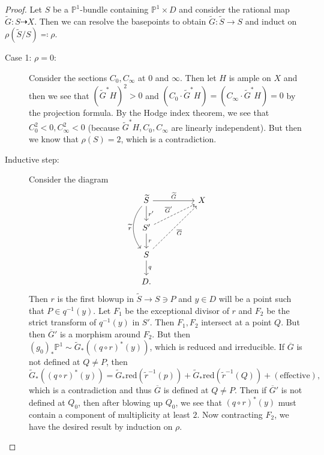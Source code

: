 \documentclass[leqno, openany]{memoir}
\theoremstyle{definition}
\theoremstyle{remark}
\theoremstyle{plain}
\theoremstyle{definition}
\theoremstyle{remark}
\renewcommand{\P}{\mathbb{P}}
\newcommand{\mr}[1]{\mathrm{#1}}
\newcommand{\ol}[1]{\overline{#1}}
\newcommand{\wt}[1]{\widetilde{#1}}
\begin{document}
\begin{proof}
    Let $S$ be a $\P^1$-bundle containing $\P^1 \times D$ and consider the rational map $\wt{G} \colon S \dashrightarrow X$. Then we can resolve the basepoints to obtain $\wt{G} \colon \wt{S} \to S$ and induct on $\rho(\wt{S} / S) \eqqcolon \rho$.
    \begin{description}
        \item[Case 1: $\rho = 0$:] Consider the sections $C_0, C_{\infty}$ at $0$ and $\infty$. Then let $H$ is ample on $X$ and then we see that ${(\wt{G}^* H)}^2 > 0$ and ${(C_0 \cdot \wt{G}^* H)} = {(C_{\infty} \cdot \wt{G}^* H)} = 0$ by the projection formula. By the Hodge index theorem, we see that $C_0^2 < 0, C_{\infty}^2 < 0$ (because $\wt{G}^* H, C_0, C_{\infty}$ are linearly independent). But then we know that $\rho(S) = 2$, which is a contradiction.
        \item[Inductive step:] Consider the diagram
            \begin{equation*}
            \begin{tikzcd}
                \wt{S} \ar{rr}{\wt{G}} \ar{d}{r'} \ar[swap,bend right=40]{dd}{\wt{r}} & & X \\
                S' \ar{d}{r} \ar[dashrightarrow]{urr}{\ol{G}'} \\
                S \ar{d}{q} \ar[swap,dashrightarrow]{uurr}{\ol{G}} \\
                D.
            \end{tikzcd}
            \end{equation*}
            Then $r$ is the first blowup in $\wt{S} \to S \ni P$ and $y \in D$ will be a point such that $P \in q^{-1}(y)$. Let $F_1$ be the exceptional divisor of $r$ and $F_2$ be the strict transform of $q^{-1}(y)$ in $S'$. Then $F_1, F_2$ intersect at a point $Q$. But then $\ol{G}'$ is a morphism around $F_2$. But then ${(g_0)}_* \P^1 \sim \wt{G}_* ({(q \circ r)}^* (y))$, which is reduced and irreducible. If $\ol{G}$ is not defined at $Q \neq P$, then
            \[ \wt{G}_* ({(q \circ r)}^* (y)) = \wt{G}_* \mr{red}(\wt{r}^{-1}(p)) + \wt{G}_* \mr{red} (\wt{r}^{-1}(Q)) + (\text{effective}), \]
            which is a contradiction and thus $\ol{G}$ is defined at $Q \neq P$. Then if $\ol{G}'$ is not defined at $Q_0$, then after blowing up $Q_0$, we see that ${(q \circ r)}^* (y)$ must contain a component of multiplicity at least $2$. Now contracting $F_2$, we have the desired result by induction on $\rho$. \qedhere
    \end{description}
\end{proof}
\end{document}
